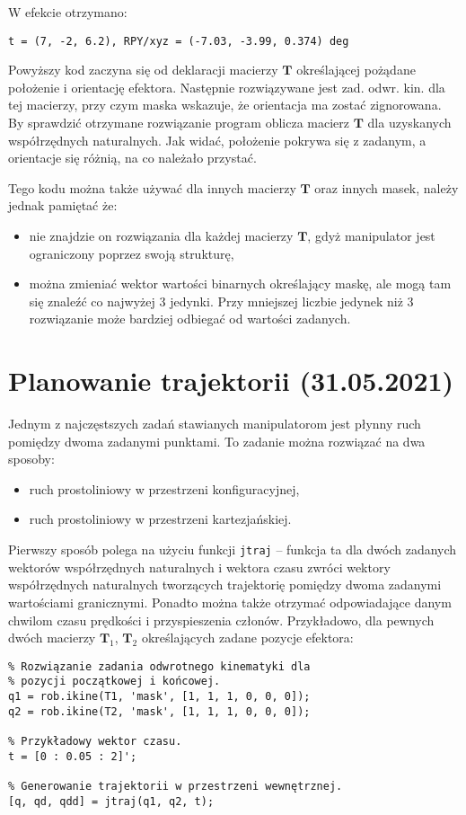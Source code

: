 \documentclass[11pt, a4paper]{article}
\newcommand{\matrixT}{$\mathbf{T}$}
\begin{document}
W efekcie otrzymano:
\begin{lstlisting}[numbers = none]
t = (7, -2, 6.2), RPY/xyz = (-7.03, -3.99, 0.374) deg
\end{lstlisting}

Powyższy kod zaczyna się od deklaracji macierzy \matrixT{} określającej pożądane położenie i orientację efektora. Następnie rozwiązywane jest zad. odwr. kin. dla tej macierzy, przy czym maska wskazuje, że orientacja ma zostać zignorowana. By sprawdzić otrzymane rozwiązanie program oblicza macierz \matrixT{} dla uzyskanych współrzędnych naturalnych. Jak widać, położenie pokrywa się z zadanym, a orientacje się różnią, na co należało przystać.

Tego kodu można także używać dla innych macierzy \matrixT{} oraz innych masek, należy jednak pamiętać że:
\begin{itemize}
\item nie znajdzie on rozwiązania dla każdej macierzy \matrixT{}, gdyż manipulator jest ograniczony poprzez swoją strukturę,
\item można zmieniać wektor wartości binarnych określający maskę, ale mogą tam się znaleźć co najwyżej 3 jedynki. Przy mniejszej liczbie jedynek niż 3 rozwiązanie może bardziej odbiegać od wartości zadanych.
\end{itemize}

\newpage



%
%

\section{Planowanie trajektorii (31.05.2021)}

Jednym z najczęstszych zadań stawianych manipulatorom jest płynny ruch pomiędzy dwoma zadanymi punktami. To zadanie można rozwiązać na dwa sposoby:
\begin{itemize}
\item ruch prostoliniowy w przestrzeni konfiguracyjnej,
\item ruch prostoliniowy w przestrzeni kartezjańskiej.
\end{itemize}

Pierwszy sposób polega na użyciu funkcji \texttt{jtraj} -- funkcja ta dla dwóch zadanych wektorów współrzędnych naturalnych i wektora czasu zwróci wektory współrzędnych naturalnych tworzących trajektorię pomiędzy dwoma zadanymi wartościami granicznymi. Ponadto można także otrzymać odpowiadające danym chwilom czasu prędkości i przyspieszenia członów. Przykładowo, dla pewnych dwóch macierzy $\mathbf{T}_1$, $\mathbf{T}_2$ określających zadane pozycje efektora:
\begin{lstlisting}
% Rozwiązanie zadania odwrotnego kinematyki dla
% pozycji początkowej i końcowej.
q1 = rob.ikine(T1, 'mask', [1, 1, 1, 0, 0, 0]);
q2 = rob.ikine(T2, 'mask', [1, 1, 1, 0, 0, 0]);

% Przykładowy wektor czasu.
t = [0 : 0.05 : 2]';

% Generowanie trajektorii w przestrzeni wewnętrznej.
[q, qd, qdd] = jtraj(q1, q2, t);
\end{lstlisting}
\end{document}
